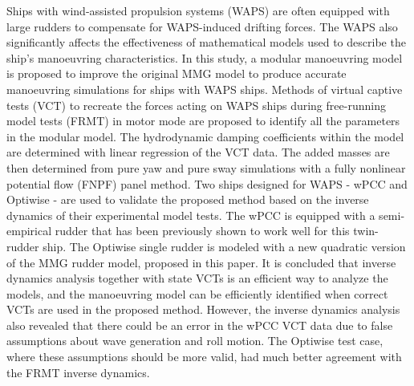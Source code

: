 Ships with wind-assisted propulsion systems (WAPS) are often equipped with large rudders to compensate for WAPS-induced drifting forces. The WAPS also significantly affects the effectiveness of mathematical models used to describe the ship's manoeuvring characteristics. In this study, a modular manoeuvring model is proposed to improve the original MMG model to produce accurate manoeuvring simulations for ships with WAPS ships. 
Methods of virtual captive tests (VCT) to recreate the forces acting on WAPS ships during free-running model tests (FRMT) in motor mode are proposed to identify all the parameters in the modular model. 
The hydrodynamic damping coefficients within the model are determined with linear regression of the VCT data. The added masses are then determined from pure yaw and pure sway simulations with a fully nonlinear potential flow (FNPF) panel method.
Two ships designed for WAPS - wPCC and Optiwise - are used to validate the proposed method based on the inverse dynamics of their experimental model tests. The wPCC is equipped with a semi-empirical rudder that has been previously shown to work well for this twin-rudder ship. The Optiwise single rudder is modeled with a new quadratic version of the MMG rudder model, proposed in this paper. 
It is concluded that inverse dynamics analysis together with state VCTs is an efficient way to analyze the models, and the manoeuvring model can be efficiently identified when correct VCTs are used in the proposed method. However, the inverse dynamics analysis also revealed that there could be an error in the wPCC VCT data due to false assumptions about wave generation and roll motion. The Optiwise test case, where these assumptions should be more valid, had much better agreement with the FRMT inverse dynamics. 


%    

